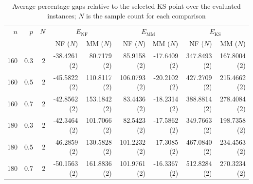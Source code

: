 \begin{table}[ht!]
\centering
\caption{Average percentage gaps relative to the selected KS point over the evaluated instances; $N$ is the sample count for each comparison}
\begin{tabular}{rrr rrr rrr}
\toprule
$n$ & $p$ & $N$ & \multicolumn{2}{c}{$E_{\mathrm{NF}}$} & \multicolumn{2}{c}{$E_{\mathrm{MM}}$} & \multicolumn{2}{c}{$E_{\mathrm{KS}}$} \\
 & & & NF ($N$) & MM ($N$) & NF ($N$) & MM ($N$) & NF ($N$) & MM ($N$) \\
\midrule
160 & 0.3 & 2 & -38.4261 (2) & 80.7179 (2) & 85.9158 (2) & -17.6409 (2) & 347.8493 (2) & 167.8004 (2) \\
160 & 0.5 & 2 & -45.5822 (2) & 110.8117 (2) & 106.0793 (2) & -20.2102 (2) & 427.2709 (2) & 215.4662 (2) \\
160 & 0.7 & 2 & -42.8562 (2) & 153.1842 (2) & 83.4436 (2) & -18.2314 (2) & 388.8814 (2) & 278.4084 (2) \\
180 & 0.3 & 2 & -42.3464 (2) & 101.7066 (2) & 82.5423 (2) & -17.5862 (2) & 349.7663 (2) & 198.7358 (2) \\
180 & 0.5 & 2 & -46.2859 (2) & 130.5828 (2) & 101.2232 (2) & -17.3085 (2) & 467.0840 (2) & 234.4563 (2) \\
180 & 0.7 & 2 & -50.1563 (2) & 161.8836 (2) & 101.9761 (2) & -16.3367 (2) & 512.8284 (2) & 270.3234 (2) \\
\bottomrule
\end{tabular}
\end{table}
